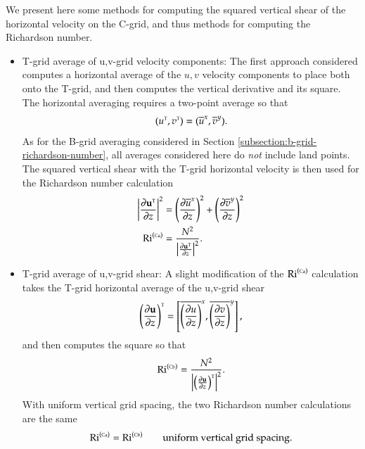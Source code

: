 We present here some methods for computing the squared vertical shear
of the horizontal velocity on the C-grid, and thus methods for
computing the Richardson number. 
\begin{itemize}

\item {\sc T-grid average of u,v-grid velocity components}: The first
  approach considered computes a horizontal average of the $u,v$
  velocity components to place both onto the T-grid, and then computes
  the vertical derivative and its square.  The horizontal averaging
  requires a two-point average so that 
\begin{equation}
  (u^{\mbox{\tiny T}}, v^{\mbox{\tiny T}}) = (\overline{u}^{x}, \overline{v}^{y}).
\end{equation}
As for the B-grid averaging considered in Section
\ref{subsection:b-grid-richardson-number}, all averages considered
here do {\it not} include land points. The squared vertical shear with
the T-grid horizontal velocity is then used for the Richardson number
calculation
\begin{align}
 \left| \frac{\partial {\bf u}^{\mbox{\tiny T}}}{\partial z} \right|^{2}
 &= \left( \frac{\partial \overline{u}^{x}}{\partial z} \right)^{2} 
     +
     \left( \frac{\partial \overline{v}^{y}}{\partial z} \right)^{2} 
\\
    \mbox{Ri}^{(\mbox{\tiny Ca})} &= \frac{N^{2}} { \left| \frac{\partial {\bf u}^{\mbox{\tiny T}}}{\partial z} \right|^{2} }.
\end{align}


\item {\sc T-grid average of u,v-grid shear}: A slight modification of
  the $\mbox{Ri}^{(\mbox{\tiny Ca})}$ calculation takes the T-grid
  horizontal average of the u,v-grid shear
\begin{equation}
  \left( \frac{\partial {\bf u}}{\partial z} \right)^{\mbox{\tiny T}}
  = 
  \left[  \overline{ \left( \frac{\partial u}{\partial z} \right)}^{x}, \overline{ \left( \frac{\partial v}{\partial z} \right)}^{y}
   \right],
\end{equation}
and then computes the square so that
\begin{equation}
    \mbox{Ri}^{(\mbox{\tiny Cb})} = \frac{N^{2}} { \left|  \left( \frac{\partial {\bf u}}{\partial z} \right)^{\mbox{\tiny T}} \right|^{2} }.
\end{equation}
With uniform vertical grid spacing, the two Richardson number
calculations are the same
\begin{equation}
 \mbox{Ri}^{(\mbox{\tiny Ca})} = \mbox{Ri}^{(\mbox{\tiny Cb})}  \qquad \mbox{uniform vertical grid spacing.}
\end{equation}


\end{itemize}
